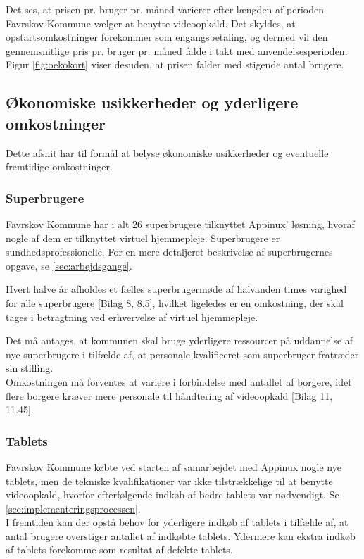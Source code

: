 Det ses, at prisen pr. bruger pr. måned varierer efter længden af perioden Favrskov Kommune vælger at benytte videoopkald.
Det skyldes, at opstartsomkostninger forekommer som engangsbetaling, og dermed vil den gennemsnitlige pris pr. bruger pr. måned falde i takt med anvendelsesperioden. Figur \ref{fig:oekokort} viser desuden, at prisen falder med stigende antal brugere.  

\subsection{Økonomiske usikkerheder og yderligere omkostninger}
Dette afsnit har til formål at belyse økonomiske usikkerheder og eventuelle fremtidige omkostninger. 

\subsubsection{Superbrugere}
Favrskov Kommune har i alt 26 superbrugere tilknyttet Appinux’ løsning, hvoraf nogle af dem er tilknyttet virtuel hjemmepleje. Superbrugere er sundhedsprofessionelle. For en mere detaljeret beskrivelse af superbrugernes opgave, se \vref{sec:arbejdsgange}.   

Hvert halve år afholdes et fælles superbrugermøde af halvanden times varighed for alle superbrugere [Bilag 8, 8.5], hvilket ligeledes er en omkostning, der skal tages i betragtning ved erhvervelse af virtuel hjemmepleje. 

Det må antages, at kommunen skal bruge yderligere ressourcer på uddannelse af nye superbrugere i tilfælde af, at personale kvalificeret som superbruger fratræder sin stilling. \\
Omkostningen må forventes at variere i forbindelse med antallet af borgere, idet flere borgere kræver mere personale til håndtering af videoopkald [Bilag 11, 11.45].

\subsubsection{Tablets}
Favrskov Kommune købte ved starten af samarbejdet med Appinux nogle nye tablets, men de tekniske kvalifikationer var ikke tilstrækkelige til at benytte videoopkald, hvorfor efterfølgende indkøb af bedre tablets var nødvendigt. Se \vref{sec:implementeringsprocessen}.  \\
I fremtiden kan der opstå behov for yderligere indkøb af tablets i tilfælde af, at antal brugere overstiger antallet af indkøbte tablets. Ydermere kan ekstra indkøb af tablets forekomme som resultat af defekte tablets.

